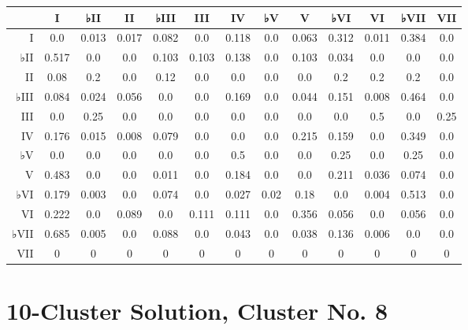 \begin{table}[htbp]
\begin{minipage}{\linewidth}
\setlength{\tymax}{0.5\linewidth}
\centering
\small
\begin{tabulary}{\textwidth}{@{}RCCCCCCCCCCCC@{}} \toprule
&I&♭II&II&♭III&III&IV&♭V&V&♭VI&VI&♭VII&VII\\
\midrule
I&0.0&0.013&0.017&0.082&0.0&0.118&0.0&0.063&0.312&0.011&0.384&0.0\\
♭II&0.517&0.0&0.0&0.103&0.103&0.138&0.0&0.103&0.034&0.0&0.0&0.0\\
II&0.08&0.2&0.0&0.12&0.0&0.0&0.0&0.0&0.2&0.2&0.2&0.0\\
♭III&0.084&0.024&0.056&0.0&0.0&0.169&0.0&0.044&0.151&0.008&0.464&0.0\\
III&0.0&0.25&0.0&0.0&0.0&0.0&0.0&0.0&0.0&0.5&0.0&0.25\\
IV&0.176&0.015&0.008&0.079&0.0&0.0&0.0&0.215&0.159&0.0&0.349&0.0\\
♭V&0.0&0.0&0.0&0.0&0.0&0.5&0.0&0.0&0.25&0.0&0.25&0.0\\
V&0.483&0.0&0.0&0.011&0.0&0.184&0.0&0.0&0.211&0.036&0.074&0.0\\
♭VI&0.179&0.003&0.0&0.074&0.0&0.027&0.02&0.18&0.0&0.004&0.513&0.0\\
VI&0.222&0.0&0.089&0.0&0.111&0.111&0.0&0.356&0.056&0.0&0.056&0.0\\
♭VII&0.685&0.005&0.0&0.088&0.0&0.043&0.0&0.038&0.136&0.006&0.0&0.0\\
VII&0&0&0&0&0&0&0&0&0&0&0&0\\

\bottomrule

\end{tabulary}
\end{minipage}
\end{table}

\section{10-Cluster Solution, Cluster No. 8}
\label{10-clustersolutionclusterno.8}

